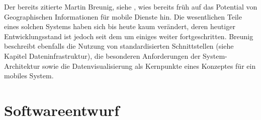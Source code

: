 Der bereits zitierte Martin Breunig, siehe \citep{breunig_entwicklung_2003}, wies bereits früh auf das Potential von Geographischen Informationen für mobile Dienste hin. Die wesentlichen Teile eines solchen Systems haben sich bis heute kaum verändert, deren heutiger Entwicklungsstand ist jedoch seit dem um einiges weiter fortgeschritten. Breunig beschreibt ebenfalls die Nutzung von standardisierten Schnittstellen (siehe Kapitel Dateninfrastruktur), die besonderen Anforderungen der System-Architektur sowie die Datenvisualisierung als Kernpunkte eines Konzeptes für ein mobiles System.


\chapter{Softwareentwurf}
